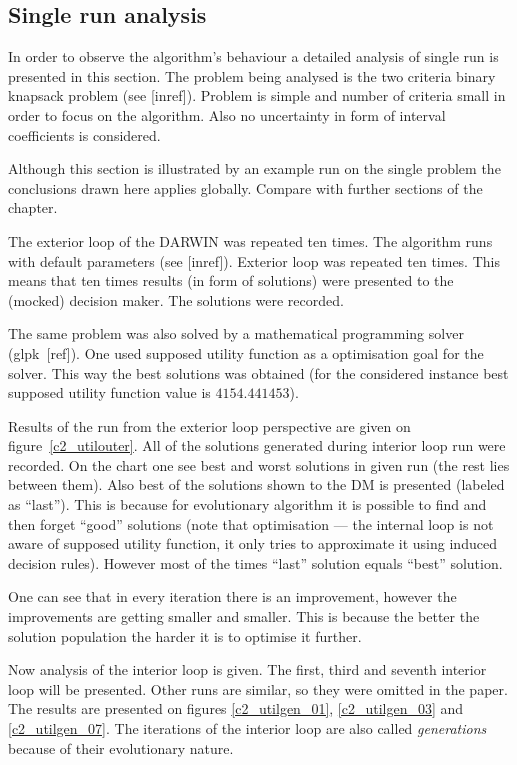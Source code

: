 \subsection{Single run analysis}
In order to observe the algorithm's behaviour a detailed analysis of single
run is presented in this section. The problem being analysed is the two
criteria binary knapsack problem (see [inref]). Problem is simple and number
of criteria small in order to focus on the algorithm. Also no uncertainty in
form of interval coefficients is considered.

Although this section is illustrated by an example run on the single problem
the conclusions drawn here applies globally. Compare with further sections of
the chapter.

The exterior loop of the DARWIN was repeated ten times. The algorithm runs
with default parameters (see [inref]). Exterior loop was repeated ten
times. This means that ten times results (in form of solutions) were presented
to the (mocked) decision maker. The solutions were recorded.

The same problem was also solved by a mathematical programming solver
(glpk~[ref]). One used supposed utility function as a optimisation goal for
the solver. This way the best solutions was obtained (for the considered
instance best supposed utility function value is $4154.441453$).

Results of the run from the exterior loop perspective are given on
figure~\ref{c2_utilouter}. All of the solutions generated during interior loop
run were recorded. On the chart one see best and worst solutions in given run
(the rest lies between them). Also best of the solutions shown to the DM is
presented (labeled as ``last''). This is because for evolutionary algorithm it
is possible to find and then forget ``good'' solutions (note that optimisation
--- the internal loop is not aware of supposed utility function, it only tries
to approximate it using induced decision rules). However most of the times
``last'' solution equals ``best'' solution.

One can see that in every iteration there is an improvement, however the
improvements are getting smaller and smaller. This is because the better the
solution population the harder it is to optimise it further.

Now analysis of the interior loop is given. The first, third and seventh
interior loop will be presented. Other runs are similar, so they were omitted
in the paper. The results are presented on figures \ref{c2_utilgen_01},
\ref{c2_utilgen_03} and \ref{c2_utilgen_07}. The iterations of the interior
loop are also called \textit{generations} because of their evolutionary
nature.

